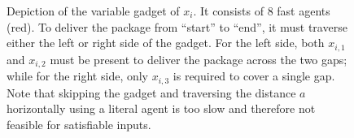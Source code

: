 

\begin{figure}[ht]
    \centering
    
    \caption{Depiction of the variable gadget of $x_i$. It consists of 8 fast agents (red). To deliver the package from ``start'' to ``end'', it must traverse either the left or right side of the gadget. For the left side, both $x_{i, 1}$ and $x_{i, 2}$ must be present to deliver the package across the two gaps; while for the right side, only $x_{i, 3}$ is required to cover a single gap. 
    Note that skipping the gadget and traversing the distance $a$ horizontally using a literal agent is too slow and therefore not feasible for satisfiable inputs.}
    \label{fig:grid_var_gadget}
\end{figure}

%     
 
